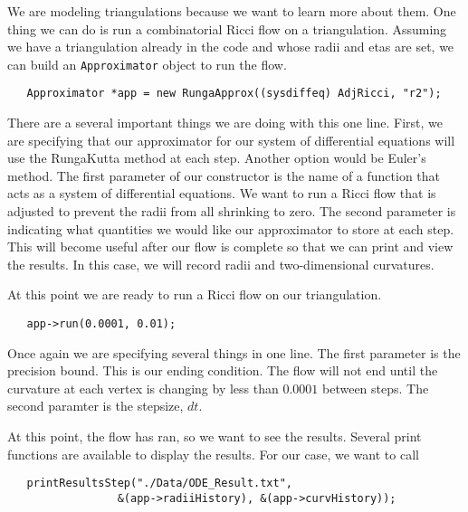 \documentclass{amsart}
\theoremstyle{plain}
\numberwithin{equation}{section}
\begin{document}
We are modeling triangulations because we want to learn more about them. One thing we can do is run a combinatorial Ricci flow on a triangulation.
Assuming we have a triangulation already in the code and whose radii and etas are set, we can build an \texttt{Approximator} object to run the flow.\newline

\begin{verbatim}
   Approximator *app = new RungaApprox((sysdiffeq) AdjRicci, "r2");
\end{verbatim}

\bigskip

There are a several important things we are doing with this one line. First, we are specifying that our approximator for our system of differential equations will use the RungaKutta method at each step. Another option would be Euler's method. The first parameter of our constructor is the name of a function that acts as a system of differential equations. We want to run a Ricci flow that is adjusted to prevent the radii from all shrinking to zero. The second parameter is indicating what quantities we would like our approximator to store at each step. This will become useful after our flow is complete so that we can print and view the results. In this case, we will record radii and two-dimensional curvatures.\newline

At this point we are ready to run a Ricci flow on our triangulation.\newline

\begin{verbatim}
   app->run(0.0001, 0.01);
\end{verbatim}

\bigskip

Once again we are specifying several things in one line. The first parameter is the precision bound. This is our ending condition. The flow will not end until the curvature at each vertex is changing by less than $0.0001$ between steps. The second paramter is the stepsize, $dt$.\newline

At this point, the flow has ran, so we want to see the results. Several print functions are available to display the results. For our case, we want to call \newline

\begin{verbatim}
   printResultsStep("./Data/ODE_Result.txt", 
                 &(app->radiiHistory), &(app->curvHistory));
\end{verbatim}
\end{document}
